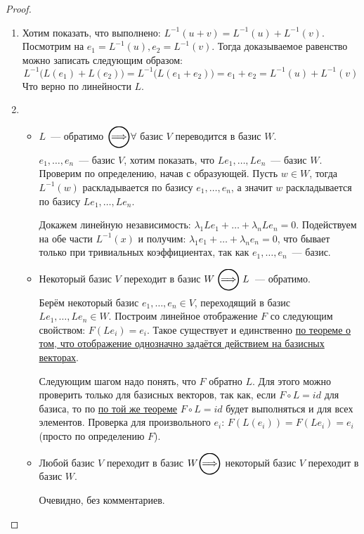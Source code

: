 \begin{proof}\leavevmode
    \begin{enumerate}
        \item 
            Хотим показать, что выполнено: $L^{-1}(u + v) = L^{-1}(u) + L^{-1}(v)$. Посмотрим на 
            $e_1 = L^{-1}(u), e_2 = L^{-1}(v)$. Тогда доказываемое равенство можно записать следующим
            образом: 
            $$L^{-1}\big(L(e_1) + L(e_2)\big) = L^{-1}\big(L(e_1 + e_2)\big) = e_1 + e_2 =
            L^{-1}(u) + L^{-1}(v)$$
            Что верно по линейности $L$.
        \item
            \begin{itemize}
                \item
                    $L$~--- обратимо $\ora \forall$ базис $V$ переводится в базис $W$.

                    $e_1,\dots,e_n$~--- базис $V$, хотим показать, что $Le_1,\dots,Le_n$~--- базис $W$.
                    Проверим по определению, начав с образующей. Пусть $w\in W$, тогда
                    $L^{-1}(w)$ раскладывается по базису $e_1,\dots, e_n$, а значит $w$
                    раскладывается по базису $Le_1,\dots, Le_n$. 

                    Докажем линейную независимость: $\lambda_1Le_1 + \dots + \lambda_nLe_n=0$.
                    Подействуем на обе части $L^{-1}(x)$ и получим: $\lambda_1e_1+\dots+\lambda_ne_n=0$, 
                    что бывает только при тривиальных коэффициентах, так как $e_1,\dots,e_n$~--- базис.
                \item
                    Некоторый базис $V$ переходит в базис $W\ora L$~--- обратимо.

                    Берём некоторый базис $e_1,\dots,e_n \in V$, переходящий в базис 
                    $Le_1,\dots,Le_n \in W$. Построим линейное отображение $F$ со следующим свойством:
                    $F(Le_i)=e_i$. Такое существует и единственно \hyperref[thm:Линейное отображение определяется действием на базисных векторах]
                    {по теореме о том, что отображение однозначно задаётся действием на базисных векторах}.

                    Следующим шагом надо понять, что $F$ обратно $L$. Для этого можно проверить
                    только для базисных векторов, так как, если $F\circ L = id$ для базиса, то по \hyperref[thm:Линейное отображение определяется действием на базисных векторах]
                    {по той же теореме} $F\circ L = id$ будет выполняться и для всех элементов.
                    Проверка для произвольного $e_i$: $F(L(e_i)) = F(Le_i) = e_i$(просто по определению $F$).
                \item
                    Любой базис $V$ переходит в базис $W\ora $ некоторый базис $V$ переходит в базис $W$.

                    Очевидно, без комментариев.
            \end{itemize}
    \end{enumerate}
\end{proof}
